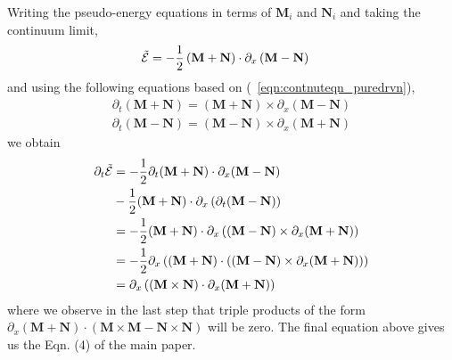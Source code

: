 \documentclass[prl,aps,twocolumn,nosuperscriptaddress,bibnotes,notitlepage,nofootinbib]{revtex4-2}
\newcommand{\magg}{\mathbf{M}}
\newcommand{\stagg}{\mathbf{N}}
\begin{document}
Writing the pseudo-energy equations in terms of $\magg_i$ and $\stagg_i$ and taking the continuum limit,
\begin{align*}
    \Tilde{\mathcal{E}} &=-\frac{1}{2} \left(\magg + \stagg \right)\cdot \partial_x \left(\magg - \stagg \right) 
\end{align*}
and using the following equations based on  (~\ref{eqn:contnuteqn_puredrvn}),
\begin{align*}
    \partial_t (\magg + \stagg) = (\magg + \stagg) \times \partial_x (\magg - \stagg) \\
    \partial_t (\magg - \stagg) = (\magg - \stagg) \times \partial_x (\magg + \stagg)
\end{align*}
we obtain 
\begin{align}
\begin{split}
\partial_t \Tilde{\mathcal{E}} &= -\frac{1}{2} \partial_t(\magg + \stagg) \cdot \partial_x (\magg - \stagg) \\
 &- \frac{1}{2}(\magg + \stagg) \cdot \partial_x \left(\partial_t(\magg - \stagg) \right) \\
 &= -\frac{1}{2} (\magg + \stagg) \cdot \partial_x \left ((\magg - \stagg) \times \partial_x (\magg + \stagg) \right) \\
		&= -\frac{1}{2} \partial_x \left( (\magg + \stagg) \cdot \left((\magg - \stagg) \times \partial_x (\magg + \stagg)\right) \right) \\
  &= \partial_x \left( (\magg \times \stagg) \cdot \partial_x (\magg + \stagg) \right)
\end{split} 
\label{eqn:pseudo}
   \end{align}
where we observe in the last step that triple products of the form $\partial_x(\magg + \stagg) \cdot (\magg \times \magg - \stagg \times \stagg)$ will be zero. The final equation above gives us the Eqn. (4) of the main paper.
\end{document}
